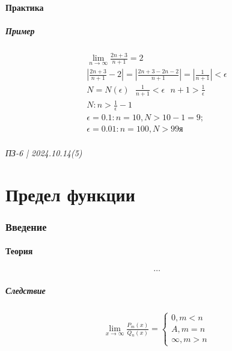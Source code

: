 \documentclass{article}
\begin{document}
\subsection{Практика}

\subsubsection{Пример}
\begin{gather*}
    \lim_{n \to \infty} \frac{2n + 3}{n + 1} = 2 \\
    \left| \frac{2n + 3}{n + 1} - 2 \right| = \left| \frac{2n + 3 - 2n - 2}{n + 1} \right| = \left| \frac{1}{n + 1} \right| < \epsilon \\
    N = N(\epsilon) ~~~ \frac{1}{n + 1} < \epsilon ~~~ n + 1 > \frac{1}{\epsilon} \\
    N: n > \frac{1}{\epsilon} - 1 \\
    \epsilon = 0.1: n = 10, N > 10 - 1 = 9; \\
    \epsilon = 0.01: n = 100, N > 99я
\end{gather*}




\newpage
\paragraph{ПЗ-6 | 2024.10.14(5)}
\part{Предел функции}

\section{Введение}

\subsection{Теория}
\begin{gather*}
    \dots
\end{gather*}

\subsubsection{Следствие}
\begin{gather*}
    \lim_{x \to \infty} \frac{P_m(x)}{Q_n(x)} =
    \begin{cases}
        0, m < n \\
        A, m = n \\
        \infty, m > n
    \end{cases}
\end{gather*}
\end{document}
